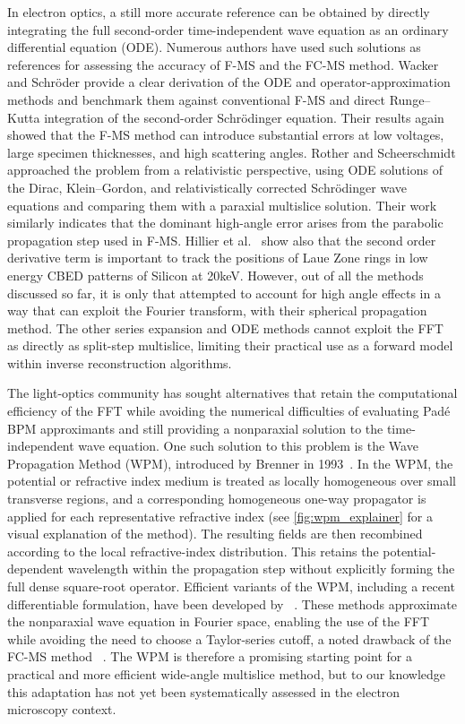 \documentclass[preprint,12pt,number]{elsarticle}
\begin{document}
In electron optics, a still more accurate reference can be obtained by directly
integrating the full second-order time-independent wave equation as an ordinary
differential equation (ODE). Numerous authors have used such solutions as
references for assessing the accuracy of F-MS and the FC-MS method.
Wacker and Schr\"oder provide a clear derivation of the ODE and
operator-approximation methods and benchmark them against conventional F-MS and
direct Runge--Kutta integration of the second-order Schr\"odinger equation.
Their results again showed that the F-MS method can introduce
substantial errors at low voltages, large specimen thicknesses, and high
scattering angles. Rother and Scheerschmidt approached the problem from a
relativistic perspective, using ODE solutions of the Dirac, Klein--Gordon, and
relativistically corrected Schr\"odinger wave equations and comparing them with
a paraxial multislice solution. Their work similarly indicates that the
dominant high-angle error arises from the parabolic propagation step used in
F-MS. Hillier et al.~\cite{hillier_role_2017} show also that the second order 
derivative term is important to track the positions of Laue Zone rings in low energy CBED patterns 
of Silicon at 20keV. However, out of all the methods discussed so far, it is only \cite{ming2013pcms} 
that attempted to account for high angle effects in a way that can exploit the Fourier transform, with their spherical
propagation method. The other series expansion and ODE methods cannot exploit the FFT as directly as
split-step multislice, limiting their practical use as a forward model within
inverse reconstruction algorithms.

The light-optics community has sought alternatives that retain the
computational efficiency of the FFT while avoiding the numerical difficulties
of evaluating Pad\'e BPM approximants and still providing a nonparaxial solution
to the time-independent wave equation. One such solution to this problem is the Wave Propagation
Method (WPM), introduced by Brenner in 1993~\cite{Brenner1993}. In the WPM, the
potential or refractive index medium is treated as locally homogeneous over small transverse regions, and a
corresponding homogeneous one-way propagator is applied for each representative
refractive index (see \ref{fig:wpm_explainer} for a visual explanation of the method). 
The resulting fields are then recombined according to the
local refractive-index distribution. This retains the potential-dependent
wavelength within the propagation step without explicitly forming the full
dense square-root operator. Efficient variants of the WPM, including a recent
differentiable formulation, have been developed by ~\cite{Schmidt2016,BarreBrunel2025}.
These methods approximate the nonparaxial wave
equation in Fourier space, enabling the use of the FFT while avoiding the need
to choose a Taylor-series cutoff, a noted drawback of the FC-MS method
~\cite{2025ChenDyckPaper}. The WPM is therefore a promising starting point for a
practical and more efficient wide-angle multislice method, but to our knowledge this adaptation has
not yet been systematically assessed in the electron microscopy context.
\end{document}
